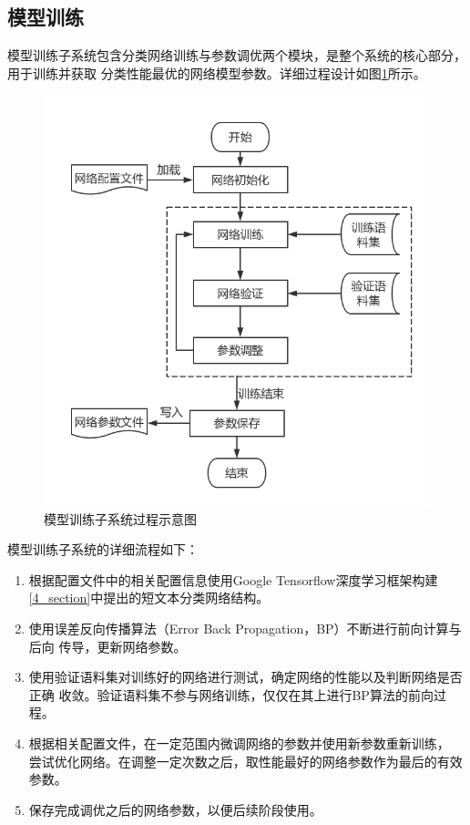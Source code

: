 \documentclass{standalone}
\begin{document}
\subsection{模型训练}
模型训练子系统包含分类网络训练与参数调优两个模块，是整个系统的核心部分，用于训练并获取
分类性能最优的网络模型参数。详细过程设计如图\ref{train}所示。
\begin{figure}[h]
    \includegraphics[scale=0.6]{picture/train.png}
    \caption{模型训练子系统过程示意图}
    \label{train}
\end{figure}
模型训练子系统的详细流程如下：
\begin{enumerate}
    \item 根据配置文件中的相关配置信息使用Google Tensorflow深度学习框架构建
    \ref{4_section}中提出的短文本分类网络结构。
    \item 使用误差反向传播算法（Error Back Propagation，BP）不断进行前向计算与后向
    传导，更新网络参数。
    \item 使用验证语料集对训练好的网络进行测试，确定网络的性能以及判断网络是否正确
    收敛。验证语料集不参与网络训练，仅仅在其上进行BP算法的前向过程。
    \item 根据相关配置文件，在一定范围内微调网络的参数并使用新参数重新训练，
    尝试优化网络。在调整一定次数之后，取性能最好的网络参数作为最后的有效参数。
    \item 保存完成调优之后的网络参数，以便后续阶段使用。
\end{enumerate}
\end{document}
